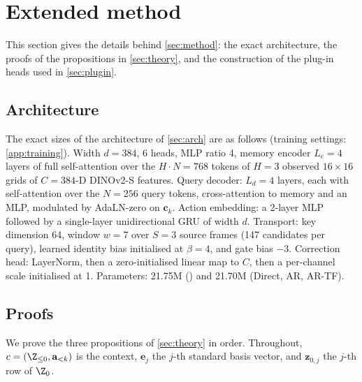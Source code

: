 \FloatBarrier
\section{Extended method}\label{app:method}
This section gives the details behind \cref{sec:method}: the exact architecture, the proofs of the propositions in
\cref{sec:theory}, and the construction of the plug-in heads used in \cref{sec:plugin}.
\FloatBarrier
\subsection{Architecture}\label{app:impl}
The exact sizes of the architecture of \cref{sec:arch} are as follows (training settings: \cref{app:training}). Width $d{=}384$, 6 heads, MLP ratio 4, memory encoder $L_e{=}4$ layers of
full self-attention over the $H\cdot N{=}768$ tokens of $H{=}3$ observed $16{\times}16$ grids of $C{=}384$-D DINOv2-S features. Query
decoder: $L_d{=}4$ layers, each with self-attention over the $N{=}256$ query tokens, cross-attention
to memory and an MLP, modulated by AdaLN-zero on $\mathbf{c}_k$. Action embedding: a 2-layer MLP
followed by a single-layer unidirectional GRU of width $d$. Transport: key dimension 64, window
$w{=}7$ over $S{=}3$ source frames (147 candidates per query), learned identity bias initialised at
$\beta{=}4$, and gate bias $-3$. Correction head: LayerNorm, then a zero-initialised linear map to $C$,
then a per-channel scale initialised at 1. Parameters: 21.75M (\ours{}) and 21.70M (Direct, AR, AR-TF).

\FloatBarrier
\subsection{Proofs}\label{app:proofs}
We prove the three propositions of \cref{sec:theory} in order. Throughout, $c=(\Z_{\le 0},\mathbf{a}_{<k})$ is the
context, $\mathbf{e}_j$ the $j$-th standard basis vector, and $\mathbf{z}_{0,j}$ the $j$-th row of $\Z_0$.

